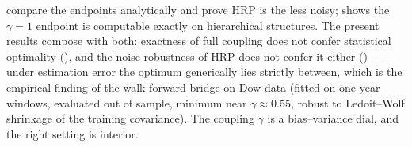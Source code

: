 \documentclass[11pt]{article}
\begin{document}
\textcite{antonov2025hrp} compare the endpoints analytically and prove HRP is
the less noisy; \textcite{mograby2025} shows the $\gamma = 1$ endpoint is
computable exactly on hierarchical structures. The present results compose
with both: exactness of full coupling does not confer statistical optimality
(), and the noise-robustness of HRP does not confer it either
() --- under estimation error the optimum generically lies
strictly between, which is the empirical finding of the walk-forward bridge on
Dow data (fitted on one-year windows, evaluated out of sample, minimum near
$\gamma \approx 0.55$, robust to Ledoit--Wolf shrinkage
\parencite{ledoitwolf2004} of the training covariance). The coupling
$\gamma$ is a bias--variance dial, and the right setting is interior.

\printbibliography
\end{document}
